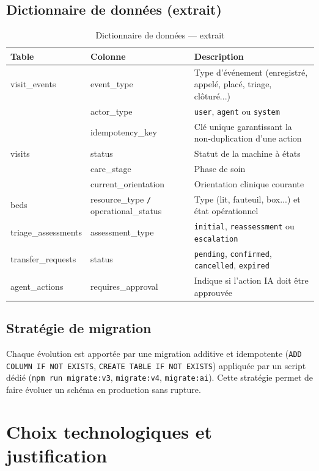 \subsection{Dictionnaire de données (extrait)}

\begin{table}[H]
\centering
\caption{Dictionnaire de données — extrait}
\label{tab:data_dictionary}
\small
\begin{tabular}{|l|l|p{6cm}|}
\hline
\textbf{Table} & \textbf{Colonne} & \textbf{Description} \\
\hline
visit\_events & event\_type & Type d'événement (enregistré, appelé, placé, triage, clôturé...) \\
\hline
 & actor\_type & \texttt{user}, \texttt{agent} ou \texttt{system} \\
\hline
 & idempotency\_key & Clé unique garantissant la non-duplication d'une action \\
\hline
visits & status & Statut de la machine à états \\
\hline
 & care\_stage & Phase de soin \\
\hline
 & current\_orientation & Orientation clinique courante \\
\hline
beds & resource\_type \texttt{/} operational\_status & Type (lit, fauteuil, box...) et état opérationnel \\
\hline
triage\_assessments & assessment\_type & \texttt{initial}, \texttt{reassessment} ou \texttt{escalation} \\
\hline
transfer\_requests & status & \texttt{pending}, \texttt{confirmed}, \texttt{cancelled}, \texttt{expired} \\
\hline
agent\_actions & requires\_approval & Indique si l'action IA doit être approuvée \\
\hline
\end{tabular}
\end{table}

\subsection{Stratégie de migration}

Chaque évolution est apportée par une migration additive et idempotente (\texttt{ADD COLUMN IF NOT EXISTS}, \texttt{CREATE TABLE IF NOT EXISTS}) appliquée par un script dédié (\texttt{npm run migrate:v3}, \texttt{migrate:v4}, \texttt{migrate:ai}). Cette stratégie permet de faire évoluer un schéma en production sans rupture.

\section{Choix technologiques et justification}

